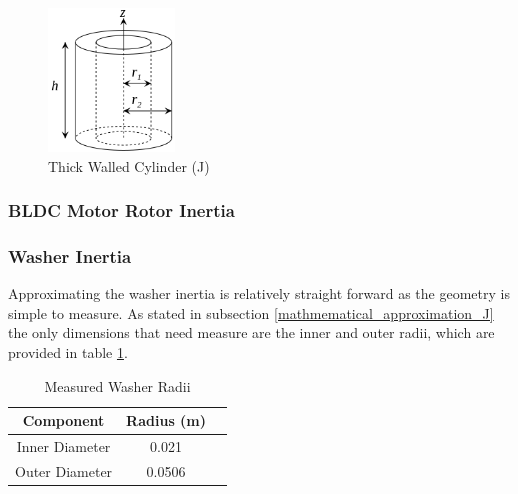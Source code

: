 \begin{figure}[htb]%
\begin{center}
    \includegraphics[height=1.5in]{figures/thick_walled_cylinder.png}

    \caption[Thick Walled Cylinder - Mass Moment of Inertia]{Thick Walled Cylinder (J)}

    \label{thick_walled_cylinder}
\end{center}
\end{figure}

\subsubsection{BLDC Motor Rotor Inertia}

\subsubsection{Washer Inertia}
Approximating the washer inertia is relatively straight forward as the geometry is simple to measure. As stated in subsection \ref{mathmematical_approximation_J} the only dimensions that need measure are the inner and outer radii, which are provided in table \ref{measured_washer_radii}.

\begin{table}[ht]
	\begin{center}
		\caption[Measured Washer Radii]{Measured Washer Radii}
		\begin{tabular}[c]{|c|c|c|}
			
			\hline
			\textbf{Component} & \textbf{Radius (m)}\\
			
			\hline
			Inner Diameter & 0.021 \\
			
			\hline
			Outer Diameter & 0.0506 \\
			
			
			\hline
		\end{tabular}
		
		\label{measured_washer_radii}
	\end{center}
\end{table}

